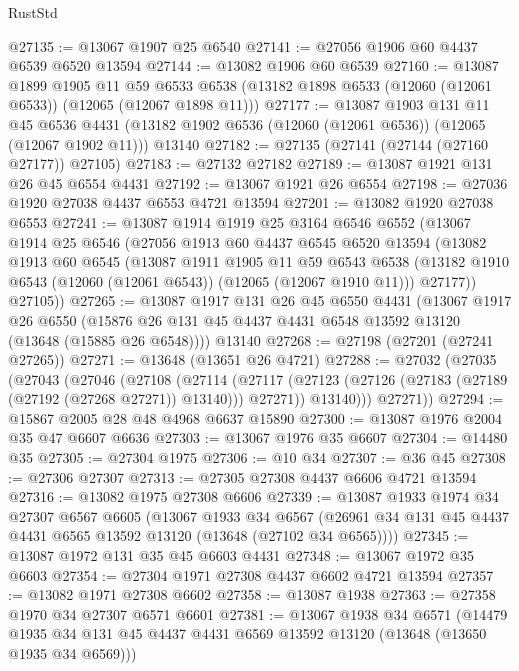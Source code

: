 \begin{lexlean}{RustStd}
\begin{coremodule}
@27135 := @13067 @1907 @25 @6540
@27141 := @27056 @1906 @60 @4437 @6539 @6520 @13594
@27144 := @13082 @1906 @60 @6539
@27160 := @13087
    @1899
    @1905
    @11
    @59
    @6533
    @6538
    (@13182 @1898 @6533 (@12060 (@12061 @6533)) (@12065 (@12067 @1898 @11)))
@27177 := @13087
    @1903
    @131
    @11
    @45
    @6536
    @4431
    (@13182 @1902 @6536 (@12060 (@12061 @6536)) (@12065 (@12067 @1902 @11)))
    @13140
@27182 := @27135 (@27141 (@27144 (@27160 @27177)) @27105)
@27183 := @27132 @27182
@27189 := @13087 @1921 @131 @26 @45 @6554 @4431
@27192 := @13067 @1921 @26 @6554
@27198 := @27036 @1920 @27038 @4437 @6553 @4721 @13594
@27201 := @13082 @1920 @27038 @6553
@27241 := @13087
    @1914
    @1919
    @25
    @3164
    @6546
    @6552
    (@13067
      @1914
      @25
      @6546
      (@27056
        @1913
        @60
        @4437
        @6545
        @6520
        @13594
        (@13082
          @1913
          @60
          @6545
          (@13087
            @1911
            @1905
            @11
            @59
            @6543
            @6538
            (@13182 @1910 @6543 (@12060 (@12061 @6543)) (@12065 (@12067 @1910 @11)))
            @27177))
        @27105))
@27265 := @13087
    @1917
    @131
    @26
    @45
    @6550
    @4431
    (@13067
      @1917
      @26
      @6550
      (@15876 @26 @131 @45 @4437 @4431 @6548 @13592 @13120 (@13648 (@15885 @26 @6548))))
    @13140
@27268 := @27198 (@27201 (@27241 @27265))
@27271 := @13648 (@13651 @26 @4721)
@27288 := @27032
    (@27035
      (@27043
        (@27046
          (@27108
            (@27114
              (@27117 (@27123 (@27126 (@27183 (@27189 (@27192 (@27268 @27271)) @13140))) @27271))
              @13140)))
        @27271))
@27294 := @15867 @2005 @28 @48 @4968 @6637 @15890
@27300 := @13087 @1976 @2004 @35 @47 @6607 @6636
@27303 := @13067 @1976 @35 @6607
@27304 := @14480 @35
@27305 := @27304 @1975
@27306 := @10 @34
@27307 := @36 @45
@27308 := @27306 @27307
@27313 := @27305 @27308 @4437 @6606 @4721 @13594
@27316 := @13082 @1975 @27308 @6606
@27339 := @13087
    @1933
    @1974
    @34
    @27307
    @6567
    @6605
    (@13067
      @1933
      @34
      @6567
      (@26961 @34 @131 @45 @4437 @4431 @6565 @13592 @13120 (@13648 (@27102 @34 @6565))))
@27345 := @13087 @1972 @131 @35 @45 @6603 @4431
@27348 := @13067 @1972 @35 @6603
@27354 := @27304 @1971 @27308 @4437 @6602 @4721 @13594
@27357 := @13082 @1971 @27308 @6602
@27358 := @13087 @1938
@27363 := @27358 @1970 @34 @27307 @6571 @6601
@27381 := @13067
    @1938
    @34
    @6571
    (@14479 @1935 @34 @131 @45 @4437 @4431 @6569 @13592 @13120 (@13648 (@13650 @1935 @34 @6569)))

\end{coremodule}
\end{lexlean}
